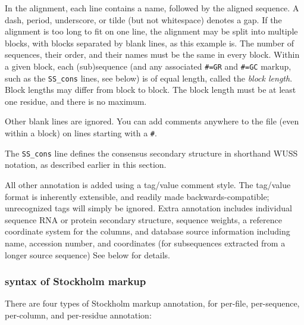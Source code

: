 In the alignment, each line contains a name, followed by the aligned
sequence. A dash, period, underscore, or tilde (but not whitespace)
denotes a gap. If the alignment is too long to fit on one line, the
alignment may be split into multiple blocks, with blocks separated by
blank lines, as this example is. The number of sequences, their order,
and their names must be the same in every block. Within a given block,
each (sub)sequence (and any associated \verb+#=GR+ and \verb+#=GC+
markup, such as the \verb+SS_cons+ lines, see below) is of equal
length, called the \textit{block length}. Block lengths may differ
from block to block. The block length must be at least one residue,
and there is no maximum. 

Other blank lines are ignored. You can add comments anywhere to the
file (even within a block) on lines starting with a \verb+#+.

The \verb+SS_cons+ line defines the consensus secondary structure in
shorthand WUSS notation, as described earlier in 
this section.

All other annotation is added using a tag/value comment style. The
tag/value format is inherently extensible, and readily made
backwards-compatible; unrecognized tags will simply be ignored. Extra
annotation includes individual sequence RNA or protein secondary
structure, sequence weights, a reference coordinate system for the
columns, and database source information including name, accession
number, and coordinates (for subsequences extracted from a longer
source sequence) See below for details.

\subsubsection{syntax of Stockholm markup}

There are four types of Stockholm markup annotation, for per-file,
per-sequence, per-column, and per-residue annotation:

